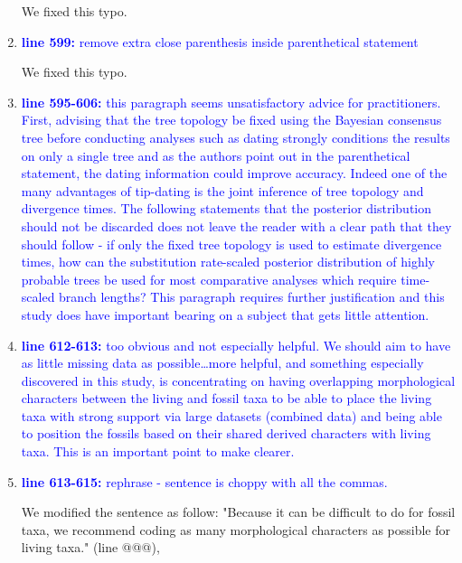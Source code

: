 \documentclass[12pt,letterpaper]{article}
\begin{document}
\begin{enumerate}
We fixed this typo.

\item{\textcolor{blue}{\textbf{line 599:} remove extra close parenthesis inside parenthetical statement}}

We fixed this typo.

\item{\textcolor{blue}{\textbf{line 595-606:} this paragraph seems unsatisfactory advice for practitioners. First, advising that the tree topology be fixed using the Bayesian consensus tree before conducting analyses such as dating strongly conditions the results on only a single tree and as the authors point out in the parenthetical statement, the dating information could improve accuracy. Indeed one of the many advantages of tip-dating is the joint inference of tree topology and divergence times. The following statements that the posterior distribution should not be discarded does not leave the reader with a clear path that they should follow - if only the fixed tree topology is used to estimate divergence times, how can the substitution rate-scaled posterior distribution of highly probable trees be used for most comparative analyses which require time-scaled branch lengths? This paragraph requires further justification and this study does have important bearing on a subject that gets little attention. }}


\item{\textcolor{blue}{\textbf{line 612-613:} too obvious and not especially helpful. We should aim to have as little missing data as possible…more helpful, and something especially discovered in this study, is concentrating on having overlapping morphological characters between the living and fossil taxa to be able to place the living taxa with strong support via large datasets (combined data) and being able to position the fossils based on their shared derived characters with living taxa. This is an important point to make clearer. }}


\item{\textcolor{blue}{\textbf{line 613-615:} rephrase - sentence is choppy with all the commas. }}

We modified the sentence as follow: "Because it can be difficult to do for fossil taxa, we recommend coding as many morphological characters as possible for living taxa." (line @@@),


\end{enumerate}
\end{document}
